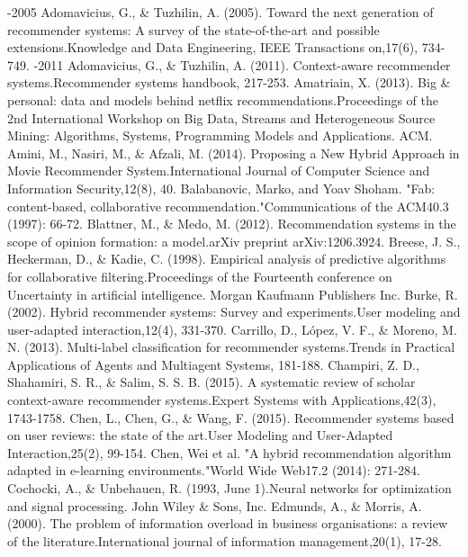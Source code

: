 \documentclass[12pt]{article}
\begin{document}
\begin{thebibliography}{100}  
-2005 Adomavicius, G., \& Tuzhilin, A. (2005). Toward the next generation of recommender systems: A survey of the state-of-the-art and possible extensions.Knowledge and Data Engineering, IEEE Transactions on,17(6), 734-749.
-2011 Adomavicius, G., \& Tuzhilin, A. (2011). Context-aware recommender systems.Recommender systems handbook, 217-253.
 Amatriain, X. (2013). Big \& personal: data and models behind netflix recommendations.Proceedings of the 2nd International Workshop on Big Data, Streams and Heterogeneous Source Mining: Algorithms, Systems, Programming Models and Applications. ACM.
 Amini, M., Nasiri, M., \& Afzali, M. (2014). Proposing a New Hybrid Approach in Movie Recommender System.International Journal of Computer Science and Information Security,12(8), 40.
 Balabanovic, Marko, and Yoav Shoham. "Fab: content-based, collaborative recommendation."Communications of the ACM40.3 (1997): 66-72.
 Blattner, M., \& Medo, M. (2012). Recommendation systems in the scope of opinion formation: a model.arXiv preprint arXiv:1206.3924.
 Breese, J. S., Heckerman, D., \& Kadie, C. (1998). Empirical analysis of predictive algorithms for collaborative filtering.Proceedings of the Fourteenth conference on Uncertainty in artificial intelligence. Morgan Kaufmann Publishers Inc.
 Burke, R. (2002). Hybrid recommender systems: Survey and experiments.User modeling and user-adapted interaction,12(4), 331-370.
 Carrillo, D., López, V. F., \& Moreno, M. N. (2013). Multi-label classification for recommender systems.Trends in Practical Applications of Agents and Multiagent Systems, 181-188.
 Champiri, Z. D., Shahamiri, S. R., \& Salim, S. S. B. (2015). A systematic review of scholar context-aware recommender systems.Expert Systems with Applications,42(3), 1743-1758.
 Chen, L., Chen, G., \& Wang, F. (2015). Recommender systems based on user reviews: the state of the art.User Modeling and User-Adapted Interaction,25(2), 99-154.
 Chen, Wei et al. "A hybrid recommendation algorithm adapted in e-learning environments."World Wide Web17.2 (2014): 271-284.
 Cochocki, A., \& Unbehauen, R. (1993, June 1).Neural networks for optimization and signal processing. John Wiley \& Sons, Inc.
 Edmunds, A., \& Morris, A. (2000). The problem of information overload in business organisations: a review of the literature.International journal of information management,20(1), 17-28.

\end{thebibliography}
\end{document}

